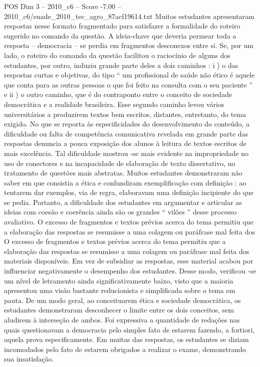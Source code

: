 \begin{textsample}{POS Dim 3 – 2010\_c6 – Score -7.00 – 2010\_c6/enade\_2010\_tec\_agro\_87acf19614.txt}
Muitos estudantes apresentaram respostas nesse formato fragmentado para satisfazer a formalidade do roteiro sugerido no comando da questão.
A ideia-chave que deveria permear toda a resposta – democracia – se perdia em fragmentos desconexos entre si.
Se, por um lado, o roteiro do comando da questão facilitou o raciocínio de alguns dos estudantes, por outro, induziu grande parte deles a dois caminhos : i ) o das respostas curtas e objetivas, do tipo “ um profissional de saúde não ético é aquele que conta para as outras pessoas o que foi feito na consulta com o seu paciente ” e ii ) o outro caminho, que é do contraponto entre o conceito de sociedade democrática e a realidade brasileira.
Esse segundo caminho levou vários universitários a produzirem textos bem escritos, distantes, entretanto, do tema exigido.
No que se reporta às especificidades do desenvolvimento do conteúdo, a dificuldade ou falta de competência comunicativa revelada em grande parte das respostas denuncia a pouca exposição dos alunos à leitura de textos escritos de mais excelência.
Tal dificuldade mostrou -se mais evidente na impropriedade no uso de conectores e na incapacidade de elaboração de texto dissertativo, no tratamento de questões mais abstratas.
Muitos estudantes demonstraram não saber em que consistia a ética e confundiram exemplificação com definição : ao tentarem dar exemplos, via de regra, elaboravam uma definição incipiente do que se pedia.
Portanto, a dificuldade dos estudantes em argumentar e articular as ideias com coesão e coerência ainda são os grandes “ vilões ” desse processo avaliativo.
O excesso de fragmentos e textos prévios acerca do tema permitiu que a elaboração das respostas se resumisse a uma colagem ou paráfrase mal feita dos O excesso de fragmentos e textos prévios acerca do tema permitiu que a elaboração das respostas se resumisse a uma colagem ou paráfrase mal feita dos materiais disponíveis.
Em vez de subsidiar as respostas, esse material acabou por influenciar negativamente o desempenho dos estudantes.
Desse modo, verificou -se um nível de letramento ainda significativamente baixo, visto que a maioria apresentou uma visão bastante reducionista e simplificada sobre o tema em pauta.
De um modo geral, ao conceituarem ética e sociedade democrática, os estudantes demonstraram desconhecer o limite entre os dois conceitos, sem aludirem à interseção de ambos.
Foi expressiva a quantidade de redações nas quais questionavam a democracia pelo simples fato de estarem fazendo, a fortiori, aquela prova especificamente.
Em muitas das respostas, os estudantes se diziam incomodados pelo fato de estarem obrigados a realizar o exame, demonstrando sua insatisfação.

\end{textsample}
